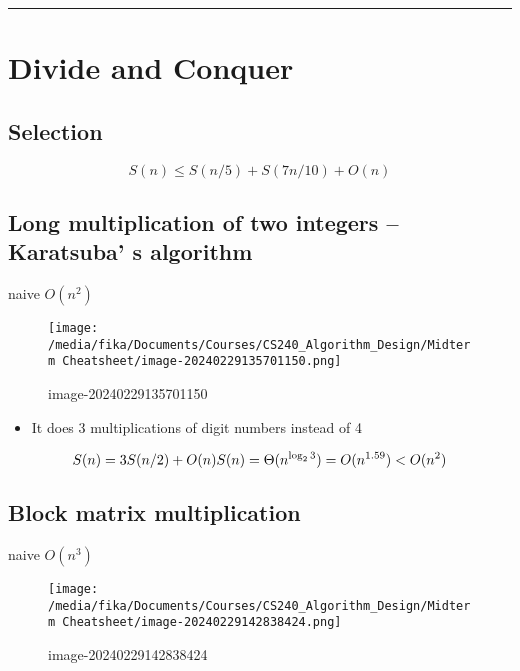 \documentclass[]{article}
\begin{document}
\begin{center}\rule{0.5\linewidth}{0.5pt}\end{center}

\hypertarget{divide-and-conquer}{%
\section{Divide and Conquer}\label{divide-and-conquer}}

\hypertarget{selection}{%
\subsection{Selection}\label{selection}}

\[S(n) \le S(n/5)+S(7n/10)+O(n)\]

\hypertarget{long-multiplication-of-two-integers----karatsuba-s-algorithm}{%
\subsection{Long multiplication of two integers -- Karatsuba' s
algorithm}\label{long-multiplication-of-two-integers----karatsuba-s-algorithm}}

naive \(O(n^2)\)

\begin{figure}
\centering
\texttt{[image: /media/fika/Documents/Courses/CS240\_Algorithm\_Design/Midterm Cheatsheet/image-20240229135701150.png]}
\caption{image-20240229135701150}
\end{figure}

\begin{itemize}
\item
  It does 3 multiplications of digit numbers instead of 4
\end{itemize}

\[S(n) = 3S(n/2)+O(n)\\
S(n) = \Theta(n^{\log_23}) = O(n^{1.59})< O(n^2)\]

\hypertarget{block-matrix-multiplication}{%
\subsection{Block matrix
multiplication}\label{block-matrix-multiplication}}

naive \(O(n^3)\)

\begin{figure}
\centering
\texttt{[image: /media/fika/Documents/Courses/CS240\_Algorithm\_Design/Midterm Cheatsheet/image-20240229142838424.png]}
\caption{image-20240229142838424}
\end{figure}
\end{document}
